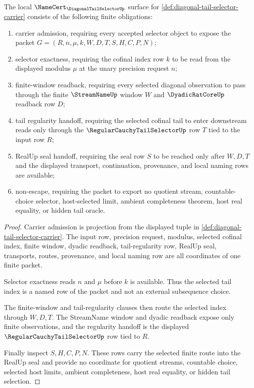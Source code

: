 \begin{theorem}
\label{thm:diagonal-tail-selector-namecert-obligations}
The local $\NameCert_{\DiagonalTailSelectorUp}$ surface for \autoref{def:diagonal-tail-selector-carrier} consists of the following finite obligations:
\begin{enumerate}
\item carrier admission, requiring every accepted selector object to expose the packet $G=(R,n,\mu,k,W,D,T,S,H,C,P,N)$;
\item selector exactness, requiring the cofinal index row $k$ to be read from the displayed modulus $\mu$ at the unary precision request $n$;
\item finite-window readback, requiring every selected diagonal observation to pass through the finite $\StreamNameUp$ window $W$ and $\DyadicRatCoreUp$ readback row $D$;
\item tail regularity handoff, requiring the selected cofinal tail to enter downstream reads only through the $\RegularCauchyTailSelectorUp$ row $T$ tied to the input row $R$;
\item RealUp seal handoff, requiring the seal row $S$ to be reached only after $W,D,T$ and the displayed transport, continuation, provenance, and local naming rows are available;
\item non-escape, requiring the packet to export no quotient stream, countable-choice selector, host-selected limit, ambient completeness theorem, host real equality, or hidden tail oracle.
\end{enumerate}
\end{theorem}
\begin{proof}
Carrier admission is projection from the displayed tuple in \autoref{def:diagonal-tail-selector-carrier}. The input row, precision request, modulus, selected cofinal index, finite window, dyadic readback, tail-regularity row, RealUp seal, transports, routes, provenance, and local naming row are all coordinates of one finite packet.

Selector exactness reads $n$ and $\mu$ before $k$ is available. Thus the selected tail index is a named row of the packet and not an external subsequence choice.

The finite-window and tail-regularity clauses then route the selected index through $W,D,T$. The StreamName window and dyadic readback expose only finite observations, and the regularity handoff is the displayed $\RegularCauchyTailSelectorUp$ row tied to $R$.

Finally inspect $S,H,C,P,N$. These rows carry the selected finite route into the RealUp seal and provide no coordinate for quotient streams, countable choice, selected host limits, ambient completeness, host real equality, or hidden tail selection.
\end{proof}

